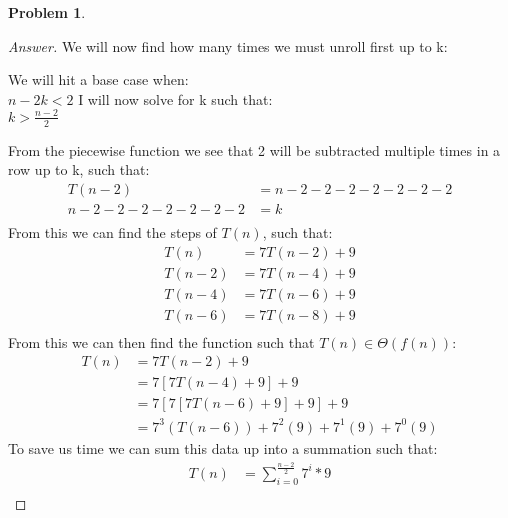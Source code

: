 \documentclass[11pt]{article}
\theoremstyle{definition}
\theoremstyle{definition}
\newtheorem{required}{Problem}
\theoremstyle{definition}
\begin{document}
\begin{required}
\begin{enumerate}
\begin{proof}[Answer] 
 We will now find how many times we must unroll first up to k: \\
\begin{center}
We will hit a base case when: \\
$n-2k < 2$
I will now solve for k such that: \\
$k > \frac{n-2}{2}$
\end{center}
From the piecewise function we see that 2 will be subtracted multiple times in a row up to k, such that: \\
\begin{align*}
T(n-2) &= n - 2 - 2 - 2 - 2 - 2 - 2 - 2 \\
n - 2 - 2 - 2 - 2 - 2 - 2 - 2 &= k \\
\end{align*}
From this we can find the steps of $T(n)$, such that: \\
\begin{align*}
T(n) &= 7T(n-2) + 9  \\
T(n-2) &= 7T(n-4) + 9 \\
T(n-4) &= 7T(n-6) + 9 \\
T(n-6) &= 7T(n-8) + 9 \\
\end{align*}
From this we can then find the function such that $T(n) \in \Theta(f(n))$: \\
\begin{align*}
T(n) &= 7T(n-2) + 9  \\
&= 7[7T(n-4) + 9] +9 \\
&= 7[7[7T(n-6) + 9] +9] + 9 \\
&= 7^3(T(n-6)) +7^2(9) + 7^1(9) + 7^0(9)
\end{align*}
To save us time we can sum this data up into a summation such that: \\
\begin{align*}
T(n) &= \sum_{i=0}^{\frac{n-2}{2}} 7^{i} * 9 \\
\end{align*}


\end{proof}
\end{enumerate}
\end{required}
\end{document}
